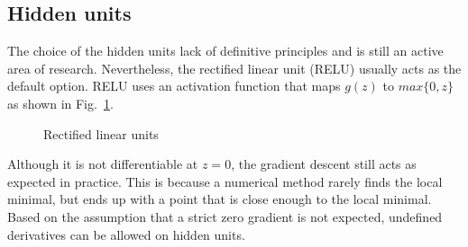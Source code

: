 \subsection{Hidden units}
The choice of the hidden units lack of definitive principles and is still an active area of research.
Nevertheless, the rectified linear unit (RELU) usually acts as the default option.
RELU uses an activation function that maps $g(z)$ to $max\{0,z\}$ as shown in Fig.~\ref{lr_fig:ml_relu}.
\begin{figure}[!ht]
    \centering
    \caption[Rectified linear units(RELU)]{Rectified linear units}
    \label{lr_fig:ml_relu}
\end{figure}
%
Although it is not differentiable at $z=0$, the gradient descent still acts as expected in practice.
This is because a numerical method rarely finds the local minimal, but ends up with a point that is close enough to the local minimal.
Based on the assumption that a strict zero gradient is not expected, undefined derivatives can be allowed on hidden units.

